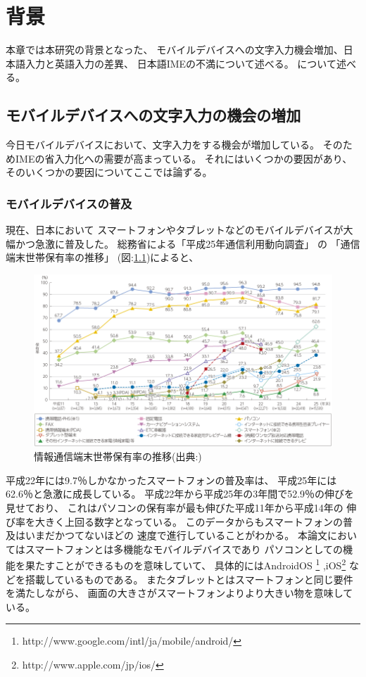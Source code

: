 \chapter{背景}
\label{chap:background}
本章では本研究の背景となった、
モバイルデバイスへの文字入力機会増加、日本語入力と英語入力の差異、
日本語IMEの不満について述べる。
について述べる。

\newpage
\section{モバイルデバイスへの文字入力の機会の増加}
今日モバイルデバイスにおいて、文字入力をする機会が増加している。
そのためIMEの省入力化への需要が高まっている。
それにはいくつかの要因があり、
そのいくつかの要因についてここでは論ずる。

\subsection{モバイルデバイスの普及}
現在、日本において
スマートフォンやタブレットなどのモバイルデバイスが大幅かつ急激に普及した。
総務省による「平成25年通信利用動向調査」
\cite{communicationreport}の
「通信端末世帯保有率の推移」
(図:\ref{fig:mobiledevicespread})によると、
\begin{figure}[htbp]
  \begin{center}
    \includegraphics[width=160mm,bb=0 0 856 494]{images/mobiledevicespread.png}
    \caption{情報通信端末世帯保有率の推移(出典:\cite{communicationreport})}
    \label{fig:mobiledevicespread}
  \end{center}
\end{figure}
平成22年には9.7％しかなかったスマートフォンの普及率は、
平成25年には62.6％と急激に成長している。
平成22年から平成25年の3年間で52.9％の伸びを見せており、
これはパソコンの保有率が最も伸びた平成11年から平成14年の
伸び率を大きく上回る数字となっている。
このデータからもスマートフォンの普及はいまだかつてないほどの
速度で進行していることがわかる。
本論文においてはスマートフォンとは多機能なモバイルデバイスであり
パソコンとしての機能を果たすことができるものを意味していて、
具体的にはAndroidOS
\footnote{http://www.google.com/intl/ja/mobile/android/}
,iOS\footnote{http://www.apple.com/jp/ios/}
などを搭載しているものである。
またタブレットとはスマートフォンと同じ要件を満たしながら、
画面の大きさがスマートフォンよりより大きい物を意味している。

